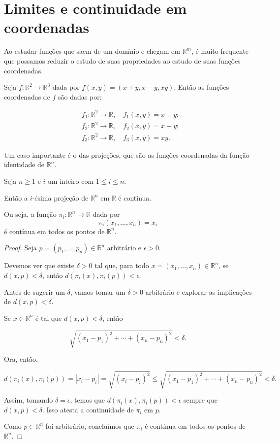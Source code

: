 \section{Limites e continuidade em coordenadas}

Ao estudar funções que saem de um domínio e chegam em $\mathbb R^m$, é muito frequente que possamos reduzir o estudo de suas propriedades ao estudo de suas funções coordenadas.

\begin{example}
    Seja $f: \mathbb R^2\to \mathbb R^3$ dada por $f(x, y) = (x+y, x-y, xy)$.
    Então as funções coordenadas de $f$ são dadas por:

    \begin{align*}
         & f_1: \mathbb R^2\to \mathbb R, \quad f_1(x, y) = x+y;\\
         & f_2: \mathbb R^2\to \mathbb R, \quad f_2(x, y) = x-y;\\
         & f_3: \mathbb R^2\to \mathbb R, \quad f_3(x, y) = xy.
    \end{align*}
\end{example}

Um caso importante é o das projeções, que são as funções coordenadas da função identidade de $\mathbb R^n$.

\begin{lemma}
    Seja $n\geq 1$ e $i$ um inteiro com $1\leq i\leq n$.

    Então a $i$-ésima projeção de $\mathbb R^n$ em $\mathbb R$ é contínua.

    Ou seja, a função $\pi_i: \mathbb R^n\to \mathbb R$ dada por
    \[
        \pi_i(x_1, \dots, x_n) = x_i
    \]
    é contínua em todos os pontos de $\mathbb R^n$.
\end{lemma}

\begin{proof}
    Seja $p=(p_1, \dots, p_n) \in \mathbb R^n$ arbitrário e $\epsilon>0$.

    Devemos ver que existe $\delta>0$ tal que, para todo $x=(x_1, \dots, x_n) \in \mathbb R^n$, se $d(x, p) < \delta$, então $d(\pi_i(x), \pi_i(p)) < \epsilon$.

    Antes de sugerir um $\delta$, vamos tomar um $\delta>0$ arbitrário e explorar as implicações de $d(x, p) < \delta$.

    Se $x\in \mathbb R^n$ é tal que $d(x, p) < \delta$, então

    \[
        \sqrt{(x_1 - p_1)^2 + \cdots + (x_n - p_n)^2} < \delta.
    \]

    Ora, então,

    \[
        d(\pi_i(x), \pi_i(p))=|x_i - p_i| = \sqrt{(x_i - p_i)^2} \leq \sqrt{(x_1 - p_1)^2 + \cdots + (x_n - p_n)^2} < \delta.
    \]

    Assim, tomando $\delta = \epsilon$, temos que $d(\pi_i(x), \pi_i(p)) < \epsilon$ sempre que $d(x, p) < \delta$.
    Isso atesta a continuidade de $\pi_i$ em $p$.

    Como $p\in \mathbb R^n$ foi arbitrário, concluímos que $\pi_i$ é contínua em todos os pontos de $\mathbb R^n$.
\end{proof}

